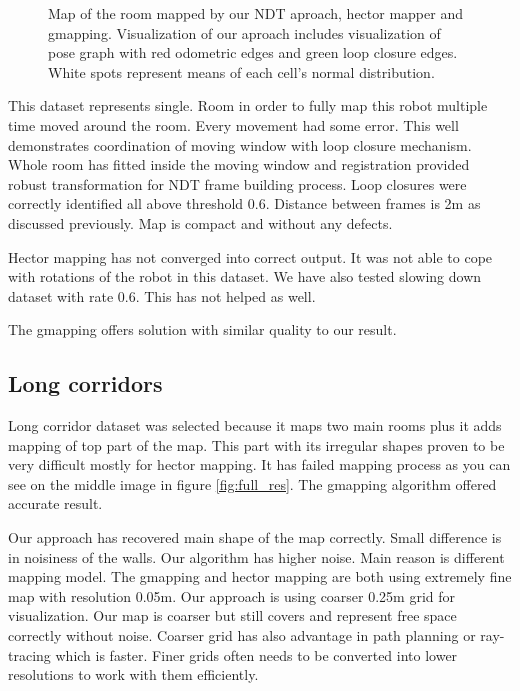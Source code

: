 \begin{figure}
	\caption{Map of the room mapped by our NDT aproach, hector mapper and gmapping. Visualization of our aproach includes visualization of pose graph with red odometric edges and green loop closure edges. White spots represent means of each cell's  normal distribution.}\label{fig:room_res}
\end{figure}
This dataset represents single. Room in order to fully map this robot multiple time moved around the room. Every movement had some error. This well demonstrates coordination of moving window with loop closure mechanism. Whole room has fitted inside the moving window and registration provided robust transformation for \gls{NDT} frame building process. Loop closures were correctly identified all above threshold 0.6. Distance between frames is 2m as discussed previously. Map is compact and without any defects.

Hector mapping has not converged into correct output. It was not able to cope with rotations of the robot in this dataset. We have also tested slowing down dataset with rate 0.6. This has not helped as well.

The gmapping offers  solution with similar quality to our result. 


\subsection{Long corridors}
Long corridor dataset was selected because it maps two main rooms plus it adds mapping of top part of the map. This part with its irregular shapes proven to be very difficult mostly for hector mapping. It has failed mapping process as you can see on the middle image in figure \ref{fig:full_res}. The gmapping algorithm offered accurate result.

Our approach has recovered main shape of the map correctly. Small difference is in noisiness of the walls. Our algorithm has higher noise. Main reason is different mapping model. The gmapping and hector mapping are both using extremely fine map with resolution 0.05m. Our approach is using coarser 0.25m grid for visualization. Our map is coarser but still covers and represent free space correctly without noise. Coarser grid has also advantage in path planning or ray-tracing which is faster. Finer grids often needs to be converted into lower resolutions to work with them efficiently.

